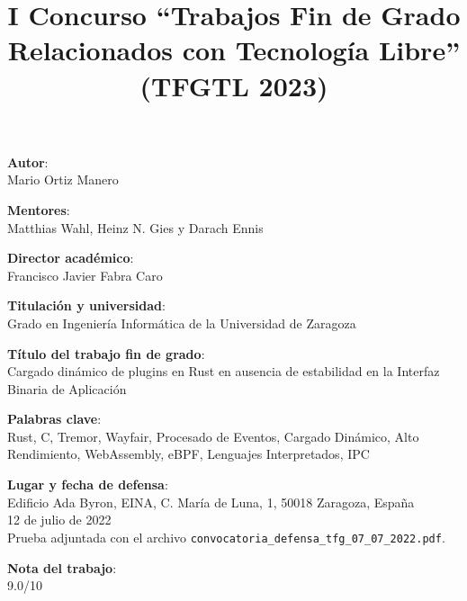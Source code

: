 \documentclass[a4paper,12pt,twoside,hidelinks,openright]{article}
\begin{document}
\newpage

\title{I Concurso ``Trabajos Fin de Grado Relacionados con Tecnología Libre'' (TFGTL 2023)}
\date{}


\begingroup
\setlength{\parskip}{\baselineskip}%
\setlength{\parindent}{0pt}%

\maketitle

\textbf{Autor}:\\
Mario Ortiz Manero

\textbf{Mentores}:\\
Matthias Wahl, Heinz N. Gies y Darach Ennis

\textbf{Director académico}:\\
Francisco Javier Fabra Caro

\textbf{Titulación y universidad}:\\
Grado en Ingeniería Informática de la Universidad de Zaragoza

\textbf{Título del trabajo fin de grado}:\\
Cargado dinámico de plugins en Rust en ausencia de estabilidad en la Interfaz Binaria de Aplicación

\textbf{Palabras clave}:\\
Rust, C, Tremor, Wayfair, Procesado de Eventos, Cargado Dinámico, Alto
Rendimiento, WebAssembly, eBPF, Lenguajes Interpretados, IPC

\textbf{Lugar y fecha de defensa}:\\
Edificio Ada Byron, EINA, C. María de Luna, 1, 50018 Zaragoza, España\\
12 de julio de 2022\\
Prueba adjuntada con el archivo
\texttt{convocatoria\_defensa\_tfg\_07\_07\_2022.pdf}.

\textbf{Nota del trabajo}:\\
9.0/10
\end{document}
